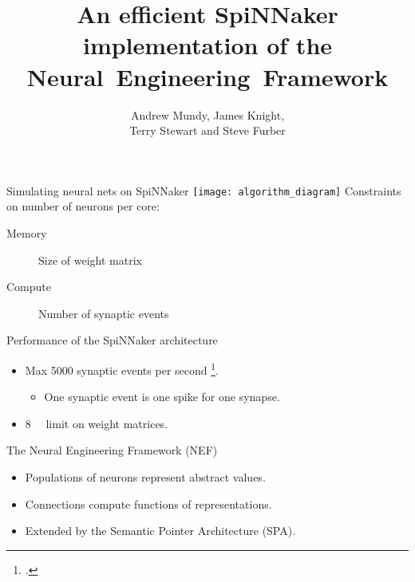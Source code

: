 \documentclass[t]{beamer}
\title{An efficient SpiNNaker implementation of the Neural~Engineering~Framework}
\author{Andrew Mundy, James Knight,\\Terry Stewart and Steve Furber}
\begin{document}
  \maketitle

  \begin{frame}{Simulating neural nets on SpiNNaker}
    \vfill
    \hspace*{-.15\textwidth}\texttt{[image: algorithm\_diagram]}
    \vfill
    \pause
    Constraints on number of neurons per core:
    \begin{description}
      \item[Memory] Size of weight matrix
      \item[Compute] Number of synaptic events
    \end{description}
  \end{frame}

  \begin{frame}{Performance of the SpiNNaker architecture}
    \begin{itemize}
      \item Max 5000 synaptic events per second \footcite{Sharp2013}.
      \begin{itemize}
        \item One synaptic event is one spike for one synapse.
      \end{itemize}
      \item \SI{8}{\mebi\byte} limit on weight matrices.
    \end{itemize}
  \end{frame}

  \begin{frame}{The Neural Engineering Framework (NEF)}
    \begin{itemize}
      \item Populations of neurons represent abstract values.
      \item Connections compute functions of representations.
      \item Extended by the Semantic Pointer Architecture (SPA).
    \end{itemize}
  \end{frame}
\end{document}
